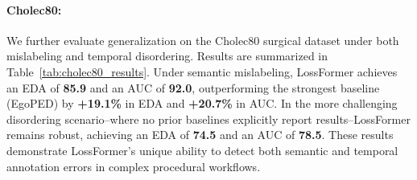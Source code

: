 \documentclass{article}
\theoremstyle{plain}
\theoremstyle{definition}
\theoremstyle{remark}
\begin{document}
\vspace{-0.4em}
\paragraph{Cholec80:}
\label{subsec:cholec80_results}
We further evaluate generalization on the Cholec80 surgical dataset under both mislabeling and temporal disordering. Results are summarized in Table~\ref{tab:cholec80_results}. Under semantic mislabeling, LossFormer achieves an EDA of \textbf{85.9} and an AUC of \textbf{92.0}, outperforming the strongest baseline (EgoPED) by \textbf{+19.1\%} in EDA and \textbf{+20.7\%} in AUC. In the more challenging disordering scenario--where no prior baselines explicitly report results--LossFormer remains robust, achieving an EDA of \textbf{74.5} and an AUC of \textbf{78.5}. These results demonstrate LossFormer's unique ability to detect both semantic and temporal annotation errors in complex procedural workflows.

\begin{table}[!ht]
\centering
\vspace{-0.2em}
\caption{Comparison of error detection performance (EDA / AUC) on the \textbf{Cholec80} dataset under two types of synthetic annotation errors: \textit{mislabeling} and \textit{temporal disordering}. LossFormer is the \textit{only method} evaluated on both error types, achieving state-of-the-art performance by a significant margin.}
\label{tab:cholec80_results}
\vspace{-0.6em}
\end{table}
\end{document}
